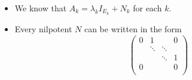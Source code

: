 \documentclass[../../notes.tex]{subfiles}
\begin{document}
\begin{itemize}
\begin{itemize}
        \item We know that $A_k=\lambda_kI_{E_k}+N_k$ for each $k$.
        \item Every nilpotent $N$ can be written in the form
        \begin{equation*}
            \begin{pmatrix}
                0 & 1 &  & 0\\
                 & \ddots & \ddots & \\
                 &  & \ddots & 1\\
                0 &  &  & 0\\
            \end{pmatrix}
        \end{equation*}
    \end{itemize}
\end{itemize}
\end{document}
